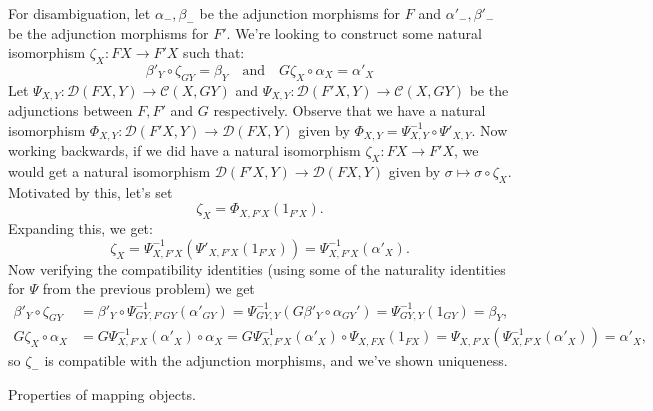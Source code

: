 \documentclass[11pt,letterpaper]{article}
\def\CC{\mathcal{C}}
\def\DD{\mathcal{D}}
\begin{document}
\begin{solution}
    \quad For disambiguation, let $\alpha_-, \beta_-$ be the adjunction morphisms for $F$ and $\alpha'_-, \beta'_-$ be the adjunction morphisms for $F'$. We're looking to construct some natural isomorphism $\zeta_X : FX \to F'X$ such that:
    \[
        \beta'_Y\circ \zeta_{GY} = \beta_Y\quad\text{and}\quad G\zeta_X\circ \alpha_X = \alpha'_X
    \]
    \quad Let $\Psi_{X,Y} : \DD(FX, Y) \to \CC(X,GY)$ and $\Psi_{X,Y} : \DD(F'X, Y) \to \CC(X,GY)$ be the adjunctions between $F,F'$ and $G$ respectively. Observe that we have a natural isomorphism $\Phi_{X,Y} : \DD(F'X, Y) \to \DD(FX,Y)$ given by $\Phi_{X,Y} = \Psi^{-1}_{X,Y}\circ \Psi'_{X,Y}$. Now working backwards, if we did have a natural isomorphism $\zeta_X : FX \to F'X$, we would get a natural isomorphism $\DD(F'X, Y) \to \DD(FX,Y)$ given by $\sigma \mapsto \sigma \circ \zeta_X$. Motivated by this, let's set
    \[
        \zeta_X = \Phi_{X, F'X}(1_{F'X})
    .\]  
    Expanding this, we get:
    \[
        \zeta_X = \Psi^{-1}_{X,F'X}(\Psi'_{X,F'X}(1_{F'X})) = \Psi^{-1}_{X,F'X}(\alpha'_X)
    .\] 
    \quad Now verifying the compatibility identities (using some of the naturality identities for $\Psi$ from the previous problem) we get
    \[
        \begin{aligned}
            \beta'_Y\circ \zeta_{GY} &= \beta'_Y\circ \Psi^{-1}_{GY,F'GY}(\alpha'_{GY}) = \Psi^{-1}_{GY, Y}(G\beta'_Y\circ \alpha_{GY}')= \Psi^{-1}_{GY,Y}(1_{GY}) = \beta_Y,\\
            G\zeta_X\circ \alpha_X &= G\Psi^{-1}_{X, F'X}(\alpha'_X)\circ \alpha_X = G\Psi^{-1}_{X,F'X}(\alpha'_X)\circ \Psi_{X, FX}(1_{FX}) = \Psi_{X,F'X}(\Psi^{-1}_{X,F'X}(\alpha'_X)) = \alpha'_X,
        \end{aligned}
    \] 
    so $\zeta_-$ is compatible with the adjunction morphisms, and we've shown uniqueness.
\end{solution}

\begin{problem}
    Properties of mapping objects.
\end{problem}
\end{document}
